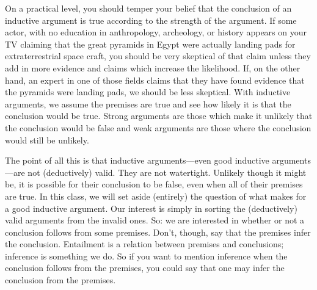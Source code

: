 On a practical level, you should temper your belief that the conclusion of an inductive argument is true according to the strength of the argument. If some actor, with no education in anthropology, archeology, or history appears on your TV claiming that the great pyramids in Egypt were actually landing pads for extraterrestrial space craft, you should be very skeptical of that claim unless they add in more evidence and claims which increase the likelihood. If, on the other hand, an expert in one of those fields claims that they have found evidence that the pyramids were landing pads, we should be less skeptical. With inductive arguments, we assume the premises are true and see how likely it is that the conclusion would be true. Strong arguments are those which make it unlikely that the conclusion would be false and weak arguments are those where the conclusion would still be unlikely.  

The point of all this is that inductive arguments—even good inductive arguments—are not (deductively) valid. They are not watertight. Unlikely though it might be, it is possible for their conclusion to be false, even when all of their premises are true. In this class, we will set aside (entirely) the question of what makes for a good inductive argument. Our interest is simply in sorting the (deductively) valid arguments from the invalid ones. So: we are interested in whether or not a conclusion follows from some premises. Don’t, though, say that the premises infer the conclusion. Entailment is a relation between premises and conclusions; inference is something we do. So if you want to mention inference when the conclusion follows from the premises, you could say that one may infer the conclusion from the premises.

\turing

